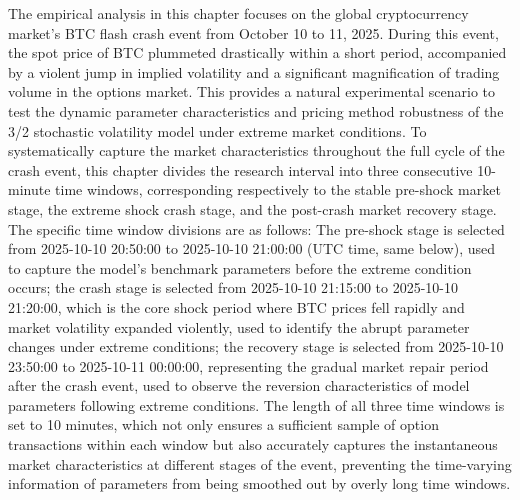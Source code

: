 The empirical analysis in this chapter focuses on the global cryptocurrency market's BTC flash crash event from October 10 to 11, 2025. During this event, the spot price of BTC plummeted drastically within a short period, accompanied by a violent jump in implied volatility and a significant magnification of trading volume in the options market. This provides a natural experimental scenario to test the dynamic parameter characteristics and pricing method robustness of the 3/2 stochastic volatility model under extreme market conditions. To systematically capture the market characteristics throughout the full cycle of the crash event, this chapter divides the research interval into three consecutive 10-minute time windows, corresponding respectively to the stable pre-shock market stage, the extreme shock crash stage, and the post-crash market recovery stage. The specific time window divisions are as follows: The pre-shock stage is selected from 2025-10-10 20:50:00 to 2025-10-10 21:00:00 (UTC time, same below), used to capture the model's benchmark parameters before the extreme condition occurs; the crash stage is selected from 2025-10-10 21:15:00 to 2025-10-10 21:20:00, which is the core shock period where BTC prices fell rapidly and market volatility expanded violently, used to identify the abrupt parameter changes under extreme conditions; the recovery stage is selected from 2025-10-10 23:50:00 to 2025-10-11 00:00:00, representing the gradual market repair period after the crash event, used to observe the reversion characteristics of model parameters following extreme conditions. The length of all three time windows is set to 10 minutes, which not only ensures a sufficient sample of option transactions within each window but also accurately captures the instantaneous market characteristics at different stages of the event, preventing the time-varying information of parameters from being smoothed out by overly long time windows.

